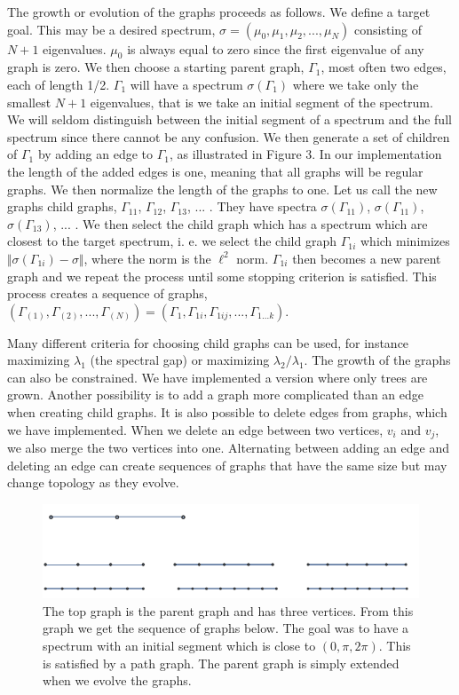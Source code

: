 \documentclass[a4paper]{article}
\begin{document}
The growth or evolution of the graphs proceeds as follows. We define a target goal. This may be a desired spectrum, $\sigma=(\mu_0,\mu_1,\mu_2,...,\mu_N)$ consisting of $N+1$ eigenvalues. $\mu_0$ is always equal to zero since the first eigenvalue of any graph is zero. We then choose a starting parent graph, $\Gamma_1$, most often two edges, each of length 1/2. $\Gamma_1$ will have a spectrum $\sigma(\Gamma_1)$ where we take only the smallest $N+1$ eigenvalues, that is we take an initial segment of the spectrum. We will seldom distinguish between the initial segment of a spectrum and the full spectrum since there cannot be any confusion. We then generate a set of children of $\Gamma_1$ by adding an edge to $\Gamma_1$, as illustrated in Figure 3. In our implementation the length of the added edges is one, meaning that all graphs will be regular graphs. We then normalize the length of the graphs to one. Let us call the new graphs child graphs, $\Gamma_{11}$, $\Gamma_{12}$, $\Gamma_{13}$, ... . They have spectra $\sigma(\Gamma_{11})$, $\sigma(\Gamma_{11})$, $\sigma(\Gamma_{13})$, ... . We then select the child graph which has a spectrum which are closest to the target spectrum,  i. e. we select the child graph $\Gamma_{1i}$ which minimizes $\Vert \sigma(\Gamma_{1i})-\sigma \Vert$, where the norm is the $\ell^2$ norm. $\Gamma_{1i}$ then becomes a new parent graph and we repeat the process until some stopping criterion is satisfied. This  process creates a sequence of graphs, $(\Gamma_{(1)},\Gamma_{(2)},...,\Gamma_{(N)})=(\Gamma_{1},\Gamma_{1i},\Gamma_{1ij},...,\Gamma_{1...k})$.

Many different criteria for choosing child graphs can be used, for instance maximizing $\lambda_1$ (the spectral gap) or maximizing $\lambda_2/\lambda_1$.
The growth of the graphs can also be constrained. We have implemented a version where only trees are grown. Another possibility is to add a graph more complicated than an edge when creating child graphs. It is also possible to delete edges from graphs, which we have implemented. When we delete an edge between two vertices, $v_i$ and $v_j$, we also merge the two vertices into one. Alternating between adding an edge and deleting an edge can create sequences of graphs that have the same size but may change topology as they evolve.



\begin{figure}
\centering
\includegraphics[width=1.0\textwidth]{EdgeGrowth.pdf}
\caption{\label{EdgeGrowth:all}The top graph is the parent graph and has three vertices. From this graph we get the sequence of graphs below. The goal was to have a spectrum with an initial segment which is close to $(0, \pi, 2 \pi)$. This is satisfied by a path graph. The parent graph is simply extended when we evolve the graphs.}
\end{figure}
\end{document}
